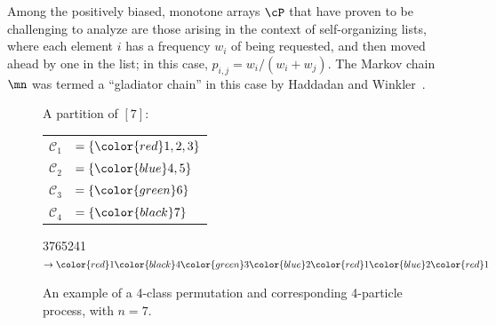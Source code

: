 \documentclass[11pt]{article}
\begin{document}
Among the positively biased, monotone %
%
arrays $\cP$  %
that have proven to 
be challenging to analyze are those arising in the context of 
self-organizing lists, where each element $i$ has a frequency $w_i$ of 
being requested, and then moved ahead
by  %
one in the list; in this case, 
$p_{i,j}=w_i/(w_i+w_j)$.  The Markov chain $\mn$ was termed a 
``gladiator chain'' in this case by Haddadan and Winkler~\cite{HW16}. 

\begin{figure}[htb]
  \centering
       \begin{minipage}[c]{.5\textwidth}
     \centering
     {\footnotesize
     A partition of $[7]$:
     \begin{tabular}{rl}
     $\mathcal{C}_1$ & $= \{{\color{red} 1,2,3}\}$\\
      $\mathcal{C}_2$ & $= \{{\color{blue} 4,5}\}$\\
      $\mathcal{C}_3$ & $= \{{\color{green} 6}\}$\\
       $\mathcal{C}_4$ & $= \{{\color{black} 7}\}$\\
     
     \end{tabular}}
     \end{minipage}\hfill
          \begin{minipage}[c]{.5\textwidth}
     \centering
           \newcommand{\one}{{\color{red}1}}
           \newcommand{\two}{{\color{blue}2}}
           \newcommand{\three}{{\color{green}3}}

          \newcommand{\four}{{\color{black}4}}

    {\color{red} 3}{\color{black}7}{\color{green}6}{\color{blue}5}{\color{red}2}{\color{blue}4}{\color{red}1} $\rightarrow \one \four \three \two \one\two\one$\\
    
       \end{minipage}\hfill
      \caption{An example of a 4-class permutation and corresponding 4-particle process, with $n=7$.}
\label{fig:Particle}
\end{figure}
\end{document}
